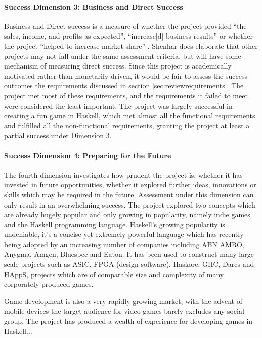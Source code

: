 \paragraph{Success Dimension 3: Business and Direct Success}
Business and Direct success is a measure of whether the project provided ``the sales, income, and profits as expected'', ``increase[d] business results'' or whether the project ``helped to increase market share'' \cite{shenhar}. Shenhar does elaborate that other projects may not fall under the same assessment criteria, but will have some mechanism of measuring direct success. Since this project is academically motivated rather than monetarily driven, it would be fair to assess the success outcomes the requirements discussed in section \ref{sec:reviewrequirements}. The project met most of these requirements, and the requirements it failed to meet were considered the least important. The project was largely successful in creating a fun game in Haskell, which met almost all the functional requirements and fulfilled all the non-functional requirements, granting the project at least a partial success under Dimension 3.
 
\paragraph{Success Dimension 4: Preparing for the Future}
The fourth dimension investigates how prudent the project is, whether it has invested in future opportunities, whether it explored further ideas, innovations or skills which may be required in the future. Assessment under this dimension can only result in an overwhelming success. The project explored two concepts which are already hugely popular and only growing in popularity, namely indie games and the Haskell programming language. Haskell's growing popularity is undeniable, it's a concise yet extremely powerful language which has recently being adopted by an increasing number of companies including ABN AMRO, Anygma, Amgen, Bluespec and Eaton. It has been used to construct many large scale projects such as ASIC, FPGA (design software), Haskore, GHC, Darcs and HAppS, projects which are of comparable size and complexity of many corporately produced games. \cite{realworldhaskell}

Game development is also a very rapidly growing market, with the advent of mobile devices the target audience for video games barely excludes any social group.  
The project has produced a wealth of experience for developing games in Haskell...

